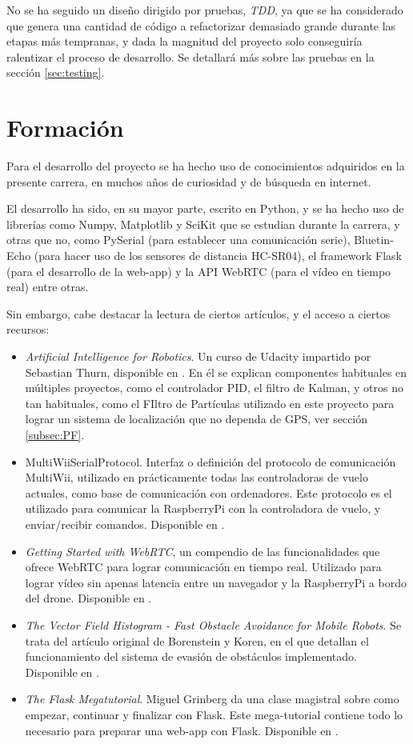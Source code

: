 No se ha seguido un diseño dirigido por pruebas, \emph{TDD}, ya que se ha considerado que genera una cantidad de código a refactorizar demasiado grande durante las etapas más tempranas, y dada la magnitud del proyecto solo conseguiría ralentizar el proceso de desarrollo. 
Se detallará más sobre las pruebas en la sección \ref{sec:testing}.


\section{Formación}

Para el desarrollo del proyecto se ha hecho uso de conocimientos adquiridos en la presente carrera, en muchos años de curiosidad y de búsqueda en internet. 

El desarrollo ha sido, en su mayor parte, escrito en Python, y se ha hecho uso de librerías como Numpy, Matplotlib y SciKit que se estudian durante la carrera, y otras que no, como PySerial (para establecer una comunicación serie), Bluetin-Echo (para hacer uso de los sensores de distancia HC-SR04), el framework Flask (para el desarrollo de la web-app) y la API WebRTC (para el vídeo en tiempo real) entre otras.

Sin embargo, cabe destacar la lectura de ciertos artículos, y el acceso a ciertos recursos:

\begin{itemize}
\item \textit{Artificial Intelligence for Robotics}. Un curso de Udacity impartido por Sebastian Thurn, disponible en \citep{wiki:UdCityPF}. En él se explican componentes habituales en múltiples proyectos, como el controlador PID, el filtro de Kalman, y otros no tan habituales, como el FIltro de Partículas utilizado en este proyecto para lograr un sistema de localización que no dependa de GPS, ver sección \ref{subsec:PF}.
\item MultiWiiSerialProtocol. Interfaz o definición del protocolo de comunicación MultiWii, utilizado en prácticamente todas las controladoras de vuelo actuales, como base de comunicación con ordenadores. Este protocolo es el utilizado para comunicar la RaspberryPi con la controladora de vuelo, y enviar/recibir comandos. Disponible en \citep{wiki:MSPDefinition}.
\item \emph{Getting Started with WebRTC}, un compendio de las funcionalidades que ofrece WebRTC para lograr comunicación en tiempo real. Utilizado para lograr vídeo sin apenas latencia entre un navegador y la RaspberryPi a bordo del drone. Disponible en \citep{wiki:WebRTCFullDesc}.
\item \emph{The Vector Field Histogram - Fast Obstacle Avoidance for Mobile Robots}. Se trata del artículo original de Borenstein y Koren, en el que detallan el funcionamiento del sistema de evasión de obstáculos implementado. Disponible en \citep{art:BorensteinKorenVFH}.
\item \emph{The Flask Megatutorial}. Miguel Grinberg da una clase magistral sobre como empezar, continuar y finalizar con Flask. Este mega-tutorial contiene todo lo necesario para preparar una web-app con Flask. Disponible en \citep{wiki:Flask}.
\end{itemize}

